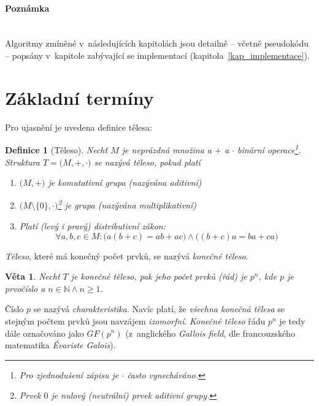 \documentclass[thesis=M,czech,hidelinks]{FITthesis}[2012/06/26]
\newcommand{\0}{{\textcolor[gray]{0.80}{0}}}
\newtheorem{definice}{Definice}
\newtheorem{veta}{Věta}
\begin{document}
\paragraph{Poznámka} \hfil \\
Algoritmy zmíněné v~následujících kapitolách jsou detailně
-- včetně pseudokódu -- popsány v~kapitole zabývající se implementací
(kapitola~\ref{kap_implementace}).
\section{Základní termíny}
Pro ujasnění je uvedena definice tělesa:

\begin{definice}[Těleso]
    Nechť $M$ je neprázdná množina a $+$ a $\cdot$ binární operace\footnote{
        Pro zjednodušení zápisu je $\cdot$ často vynecháváno.
    }. Struktura
    $T=\big(M, +, \cdot \big)$ se nazývá těleso, pokud platí
    \begin{enumerate}
        \item $\big(M, +\big)$ je \emph{komutativní grupa} (nazývána
            \emph{aditivní})
        \item $\big(M\setminus\{\mathit{0}\}, \cdot \big)$\footnote{
                Prvek $\mathit{0}$ je \emph{nulový} (\emph{neutrální}) prvek
                \emph{aditivní grupy}.
            } je \emph{grupa} (nazývána
            \emph{multiplikativní})
        \item Platí (levý i pravý) \emph{distributivní zákon}:
            $$\forall a,b,c \in M : \big( a(b+c) = a b + a c \big) \land \big(
            (b+c)a = b a + c a \big) $$
    \end{enumerate}
\end{definice}

{\setlength{\parindent}{0cm}
\emph{Těleso}, které má konečný počet prvků, se nazývá \emph{konečné těleso}.
}

\begin{veta}
    Nechť $T$ je \emph{konečné těleso}, pak jeho počet prvků (\emph{řád}) je
    $p^n$, kde $p$ je prvočíslo a $n \in \mathbb{N} \land n \geq 1 $.
\end{veta}

Číslo $p$ se nazývá \emph{charakteristika}. Navíc platí, že \emph{všechna
konečná tělesa} se stejným počtem prvků jsou navzájem \emph{izomorfní}.
\emph{Konečné těleso} řádu $p^n$ je tedy dále označováno jako $GF(p^n)$
(z~anglického \emph{Gallois field}, dle francouzského matematika
\emph{Évariste Galois}).
\end{document}

